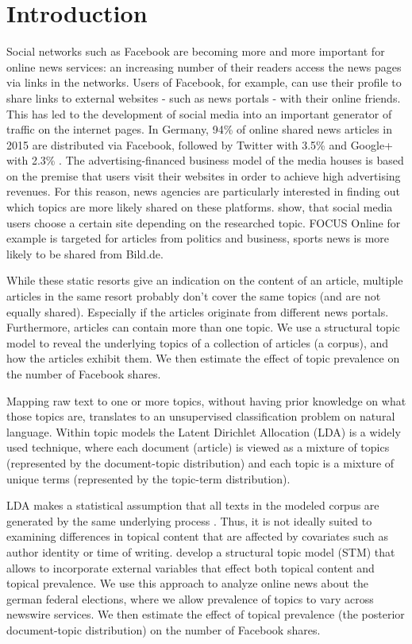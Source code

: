 \documentclass[12pt,a4paper,notitlepage]{article}
\begin{document}
\section{Introduction}

Social networks such as Facebook are becoming more and more important for online news services: an increasing number of their readers access the news pages via links in the networks. Users of Facebook, for example, can use their profile to share links to external websites - such as news portals - with their online friends. This has led to the development of social media into an important generator of traffic on the internet pages. In Germany, 94\% of online shared news articles in 2015 are distributed via Facebook, followed by Twitter with 3.5\% and Google+ with 2.3\% \citep{schiller_development_2016}. The advertising-financed business model of the media houses is based on the premise that users visit their websites in order to achieve high advertising revenues. For this reason, news agencies are particularly interested in finding out which topics are more likely shared on these platforms. \citet{schiller_development_2016} show, that social media users choose a certain site depending on the researched topic. FOCUS Online for example is targeted for articles from politics and business, sports news is more likely to be shared from Bild.de. 

While these static resorts give an indication on the content of an article, multiple articles in the same resort probably don't cover the same topics (and are not equally shared). Especially if the articles originate from different news portals. Furthermore, articles can contain more than one topic. We use a structural topic model to reveal the underlying topics of a collection of articles (a corpus), and how the articles exhibit them. We then estimate the effect of topic prevalence on the number of Facebook shares. 

Mapping raw text to one or more topics, without having prior knowledge on what those topics are, translates to an unsupervised classification problem on natural language. Within topic models the Latent Dirichlet Allocation (LDA) is a widely used technique, where each document (article) is viewed as a mixture of topics (represented by the document-topic distribution) and each topic is a mixture of unique terms (represented by the topic-term distribution).\cite{blei_latent_2003} 

LDA makes a statistical assumption that all texts in the modeled corpus are generated by the same underlying process \citep{blei_latent_2003}. Thus, it is not ideally suited to examining differences in topical content that are affected by covariates such as author identity or time of writing. \citet{roberts_model_2016} develop a structural topic model (STM) that allows to incorporate external variables that effect both topical content and topical prevalence. We use this approach to analyze online news about the german federal elections, where we allow prevalence of topics to vary across newswire services. We then estimate the effect of topical prevalence (the posterior document-topic distribution) on the number of Facebook shares.
\end{document}
